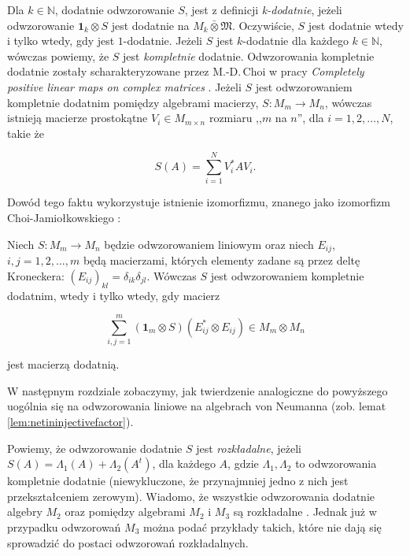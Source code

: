 Dla $k \in \mathbb{N}$, dodatnie odwzorowanie $S$,
jest z definicji \emph{k-dodatnie}, jeżeli
odwzorowanie
$\mathbf{1}_{k} \otimes S$
jest dodatnie na $M_{k} \bar{\otimes} \mathfrak{M}$.
Oczywiście, $S$ jest dodatnie wtedy i tylko wtedy, gdy jest $1$-dodatnie.
Jeżeli $S$ jest $k$-dodatnie dla każdego $k \in \mathbb{N}$,
wówczas powiemy, że $S$ jest \emph{kompletnie} dodatnie.
Odwzorowania kompletnie dodatnie zostały scharakteryzowane przez M.-D.\,Choi
w pracy \emph{Completely positive linear maps on complex matrices}
\cite{choi1975completely}.
Jeżeli $S$ jest odwzorowaniem kompletnie dodatnim pomiędzy algebrami macierzy,
$S: M_{m} \rightarrow M_{n}$, wówczas istnieją macierze prostokątne
$V_{i} \in M_{m \times n}$ rozmiaru ,,$m$ na $n$'', dla $i = 1,2,\ldots,N$,
takie że
\begin{linenomath*}
 \begin{equation}
    S(A) = \sum \limits_{i = 1}^{N} V_{i}^{*} A V_{i}.
 \end{equation}
\end{linenomath*}
Dowód tego faktu wykorzystuje istnienie izomorfizmu,
znanego jako izomorfizm Choi-Jamiołkowskiego
\cite{choi1975completely, jamiolkowski1974effective}:
\begin{Theorem}
    Niech $S: M_{m} \rightarrow M_{n}$ będzie odwzorowaniem liniowym
    oraz niech $E_{ij}$, $i,j = 1,2,\ldots,m$ będą macierzami, których
    elementy zadane są przez deltę Kroneckera:
    $(E_{ij})_{kl} = \delta_{ik} \delta_{jl}$.
    Wówczas $S$ jest odwzorowaniem kompletnie dodatnim,
    wtedy i tylko wtedy, gdy macierz
    \begin{linenomath*}
 \begin{equation}
        \sum \limits_{i,j=1}^{m} (\mathbf{1}_{m} \otimes S)
            (E_{ij}^{*} \otimes E_{ij}) \in M_{m} \otimes M_{n}
     \end{equation}
\end{linenomath*}
    jest macierzą dodatnią.
\end{Theorem}
W następnym rozdziale zobaczymy, jak twierdzenie analogiczne do powyższego
uogólnia się na odwzorowania liniowe na algebrach von Neumanna
(zob. lemat \ref{lem:netininjectivefactor}).

Powiemy, że odwzorowanie dodatnie $S$ jest \emph{rozkładalne}, jeżeli
 $S(A) = \Lambda_{1}(A) + \Lambda_{2} (A^{t})$,
 dla każdego $A$,
gdzie $\Lambda_{1}, \Lambda_{2}$ to odwzorowania kompletnie dodatnie
(niewykluczone, że przynajmniej jedno z nich jest przekształceniem zerowym).
Wiadomo, że wszystkie odwzorowania dodatnie algebry $M_{2}$
oraz pomiędzy algebrami $M_{2}$ i $M_{3}$ są rozkładalne
\cite{Stormer2013}.
Jednak już w przypadku odwzorowań $M_{3}$ można podać przykłady takich,
które nie dają się sprowadzić do postaci odwzorowań rozkładalnych.

